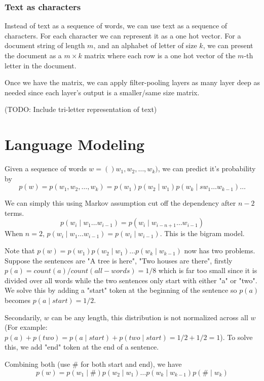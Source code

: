 \documentclass[twocolumn, 10pt]{article}
\begin{document}
\subsubsection*{Text as characters}
Instead of text as a sequence of words, we can use text as a sequence of characters. For each character we can represent it as a one hot vector. For a document string of length $m$, and an alphabet of letter of size $k$,  we can present the document as a  $m \times k$ matrix where each row is a one hot vector of the $m$-th letter in the document.

Once we have the matrix, we can apply filter-pooling layers as many layer deep as needed since each layer's output is a smaller/same size matrix. 

(TODO: Include tri-letter representation of text)

\section{Language Modeling}
Given a sequence of words $w = ()w_1, w_2, \ldots , w_k)$, we can predict it's probability by 
$$ p(w) = p(w_1, w_2, \ldots , w_k) = p(w_1 ) p(w_2 \mid w_1)  p(w_k \mid s w_{1} \ldots w_{k-1} ) \ldots $$

We can simply this using Markov assumption cut off the dependency after $n - 2$ terms. 
$$p(w_i \mid w_1 \ldots w_{i-1}) = p(w_i \mid w_{i -  n + 1} \ldots w_{i-1})$$
When $n = 2$,   $p(w_i \mid w_1 \ldots w_{i-1}) = p(w_i \mid w_{i-1})$. This is the bigram model.

 Note that $p(w) = p(w_1) p(w_2 \mid w_1) \ldots p(w_k \mid w_{k-1})$ now has two problems. Suppose the sentences are "A tree is here", "Two houses are there", firstly  $p(a) = count(a) / count(all-words) = 1 / 8$ which is far too small since it is divided over all words while the two sentences only start with either "a" or "two".  We solve this by adding a "start" token at the beginning of the sentence so $p(a)$ becomes $p(a \mid start) = 1 / 2$.
 
Secondarily, $w$ can be any length, this distribution is not normalized across all $w$ (For example: $p(a) + p(two) = p(a \mid start) + p(two \mid start) = 1/2 + 1/2 = 1$). To solve this,   we add "end" token at the end of a sentence.

Combining both (use \# for both start and end),  we have 
$$ p(w) = p(w_1 \mid  \#) p(w_2 \mid w_1) \ldots p(w_k \mid w_{k-1}) p(\# \mid w_k)$$
\end{document}

